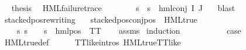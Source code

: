 \begin{isabellebody}
\ \isamarkupfalse%
\ {\isacharquery}{\kern0pt}thesis\ \isamarkupfalse%
\ {\isacartoucheopen}HML{\isacharunderscore}{\kern0pt}failure{\isacharunderscore}{\kern0pt}trace\ {\isasympsi}{\isacartoucheclose}\ \isanewline
\ \ \ \ \isamarkupfalse%
\ {\isacartoucheopen}{\isasymforall}s{\isachardot}{\kern0pt}\ {\isasymnot}\ s\ {\isasymTurnstile}\ hml{\isacharunderscore}{\kern0pt}conj\ I\ J\ {\isasymPhi}{\isacartoucheclose}\ \isamarkupfalse%
\ blast\isanewline
\ \ \isamarkupfalse%
\isanewline
{}\isamarkupfalse%
%
\endisatagproof
{\isafoldproof}%
%
\isadelimproof
\isanewline
%
\endisadelimproof
\isanewline
{}\isamarkupfalse%
\ stacked{\isacharunderscore}{\kern0pt}pos{\isacharunderscore}{\kern0pt}rewriting{\isacharcolon}{\kern0pt}\isanewline
\ \ \ {\isachardoublequoteopen}stacked{\isacharunderscore}{\kern0pt}pos{\isacharunderscore}{\kern0pt}conj{\isacharunderscore}{\kern0pt}pos\ {\isasymphi}{\isachardoublequoteclose}\ {\isachardoublequoteopen}{\isasymnot}HML{\isacharunderscore}{\kern0pt}true\ {\isasymphi}{\isachardoublequoteclose}\isanewline
\ \ \ {\isachardoublequoteopen}{\isasymexists}{\isasymalpha}{\isachardot}{\kern0pt}\ {\isacharparenleft}{\kern0pt}{\isasymforall}s{\isachardot}{\kern0pt}\ {\isacharparenleft}{\kern0pt}s\ {\isasymTurnstile}\ {\isasymphi}{\isacharparenright}{\kern0pt}\ {\isasymlongleftrightarrow}\ {\isacharparenleft}{\kern0pt}s\ {\isasymTurnstile}\ {\isacharparenleft}{\kern0pt}hml{\isacharunderscore}{\kern0pt}pos\ {\isasymalpha}\ TT{\isacharparenright}{\kern0pt}{\isacharparenright}{\kern0pt}{\isacharparenright}{\kern0pt}{\isachardoublequoteclose}\isanewline
%
\isadelimproof
\ \ %
\endisadelimproof
%
\isatagproof
{}\isamarkupfalse%
\ assms\ \isamarkupfalse%
{\isacharparenleft}{\kern0pt}induction\ {\isasymphi}{\isacharparenright}{\kern0pt}\isanewline
\ \ \isamarkupfalse%
\ {}\isanewline
\ \ \isamarkupfalse%
\ \isamarkupfalse%
\ {\isacharquery}{\kern0pt}case\ \isanewline
\ \ \ \ \isamarkupfalse%
\ HML{\isacharunderscore}{\kern0pt}true{\isacharunderscore}{\kern0pt}def\isanewline
\ \ \ \ \isamarkupfalse%
\ TT{\isacharunderscore}{\kern0pt}like{\isachardot}{\kern0pt}intros{\isacharparenleft}{\kern0pt}{}{\isacharparenright}{\kern0pt}\ HML{\isacharunderscore}{\kern0pt}true{\isacharunderscore}{\kern0pt}TT{\isacharunderscore}{\kern0pt}like\ \isamarkupfalse%

\end{isabellebody}
